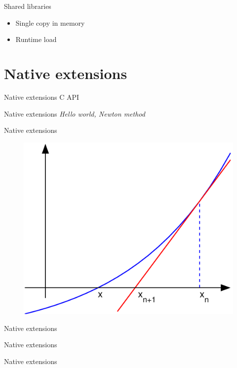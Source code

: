 \documentclass{beamer}
\begin{document}
\begin{frame}{Shared libraries}
  \begin{itemize}
    \item Single copy in memory
    \item Runtime load
  \end{itemize}
\end{frame}

\section{Native extensions}

\begin{frame}{Native extensions}
  C API
\end{frame}

\begin{frame}{Native extensions}
  \textit{Hello world, Newton method}
\end{frame}

\begin{frame}{Native extensions}
    \begin{figure}
      \includegraphics[width=0.6\linewidth]{newton.png}
    \end{figure}
\end{frame}

\begin{frame}{Native extensions}
\begin{block}{}
  \lstnative
\end{block}
\end{frame}

\begin{frame}{Native extensions}
\begin{block}{}
  \lstnativen
\end{block}
\end{frame}

\begin{frame}{Native extensions}
\begin{block}{}
\end{block}
\end{frame}
\end{document}
